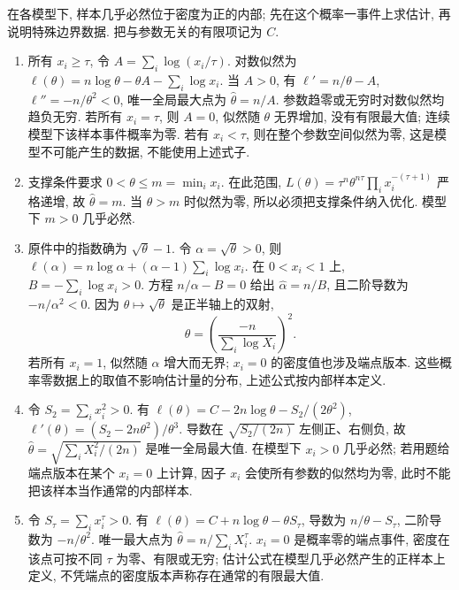 \begin{solution}
在各模型下, 样本几乎必然位于密度为正的内部; 先在这个概率一事件上求估计, 再说明特殊边界数据. 把与参数无关的有限项记为 $C$.
\begin{enumerate}[label=\arabic*.]
\item 所有 $x_i\ge\tau$, 令 $A=\sum_i\log(x_i/\tau)$. 对数似然为 $\ell(\theta)=n\log\theta-\theta A-\sum_i\log x_i$. 当 $A>0$, 有 $\ell'=n/\theta-A$, $\ell''=-n/\theta^2<0$, 唯一全局最大点为
$\hat\theta=n/A$. 参数趋零或无穷时对数似然均趋负无穷. 若所有 $x_i=\tau$, 则 $A=0$, 似然随 $\theta$ 无界增加, 没有有限最大值; 连续模型下该样本事件概率为零. 若有 $x_i<\tau$, 则在整个参数空间似然为零, 这是模型不可能产生的数据, 不能使用上述式子.
\item 支撑条件要求 $0<\theta\le m=\min_i x_i$. 在此范围, $L(\theta)=\tau^n\theta^{n\tau}\prod_i x_i^{-(\tau+1)}$ 严格递增, 故 $\hat\theta=m$. 当 $\theta>m$ 时似然为零, 所以必须把支撑条件纳入优化. 模型下 $m>0$ 几乎必然.
\item 原件中的指数确为 $\sqrt\theta-1$. 令 $\alpha=\sqrt\theta>0$, 则 $\ell(\alpha)=n\log\alpha+(\alpha-1)\sum_i\log x_i$. 在 $0<x_i<1$ 上, $B=-\sum_i\log x_i>0$. 方程 $n/\alpha-B=0$ 给出 $\hat\alpha=n/B$, 且二阶导数为 $-n/\alpha^2<0$. 因为 $\theta\mapsto\sqrt\theta$ 是正半轴上的双射,
\[
\hat\theta=\left(\frac{-n}{\sum_i\log X_i}\right)^2.
\]
若所有 $x_i=1$, 似然随 $\alpha$ 增大而无界; $x_i=0$ 的密度值也涉及端点版本. 这些概率零数据上的取值不影响估计量的分布, 上述公式按内部样本定义.
\item 令 $S_2=\sum_i x_i^2>0$. 有
$\ell(\theta)=C-2n\log\theta-S_2/(2\theta^2)$,
$\ell'(\theta)=(S_2-2n\theta^2)/\theta^3$.
导数在 $\sqrt{S_2/(2n)}$ 左侧正、右侧负, 故
$\hat\theta=\sqrt{\sum_iX_i^2/(2n)}$ 是唯一全局最大值. 在模型下 $x_i>0$ 几乎必然; 若用题给端点版本在某个 $x_i=0$ 上计算, 因子 $x_i$ 会使所有参数的似然均为零, 此时不能把该样本当作通常的内部样本.
\item 令 $S_\tau=\sum_i x_i^\tau>0$. 有 $\ell(\theta)=C+n\log\theta-\theta S_\tau$, 导数为 $n/\theta-S_\tau$, 二阶导数为 $-n/\theta^2$. 唯一最大点为
$\hat\theta=n/\sum_iX_i^\tau$. $x_i=0$ 是概率零的端点事件, 密度在该点可按不同 $\tau$ 为零、有限或无穷; 估计公式在模型几乎必然产生的正样本上定义, 不凭端点的密度版本声称存在通常的有限最大值.
\end{enumerate}
\end{solution}

